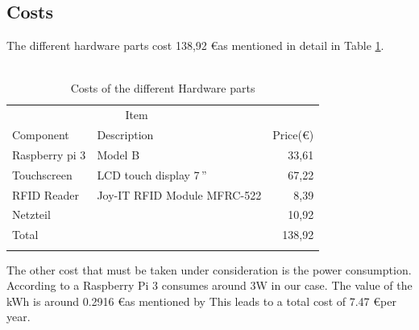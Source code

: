 \documentclass[12pt]{article}
\begin{document}
  \subsection{Costs}
  
  The different hardware parts cost 138,92 \euro as mentioned in detail in Table \ref{tab:cost}.\\~\\
  
  \begin{table}[H]
  \centering
  \begin{tabular}{llr}
   \hline
  \multicolumn{2}{c}{Item} \\
  \cline{1-2}
  Component & Description & Price(\euro) \\
  \hline
  Raspberry pi 3 & Model B & 33,61 \\
  Touchscreen & LCD touch display 7\,'' & 67,22 \\
  RFID Reader & Joy-IT RFID Module MFRC-522 & 8,39 \\
  Netzteil & & 10,92 \\
  \hline
  Total  & & 138,92 \\
  \hline
  \label{tab:cost}
  \end{tabular}
  \caption{Costs of the different Hardware parts}
  \label{tab:cost}
  \end{table}
  
  The other cost that must be taken under consideration is the power consumption.
  According to \cite{powerConsumption} a Raspberry Pi 3 consumes around 3W in our case. The value of the kWh is around 0.2916 \euro as mentioned by \cite{BDEW}
  This leads to a total cost of 7.47 \euro per year.
  
  \pagebreak
 
  \pagebreak
\end{document}
